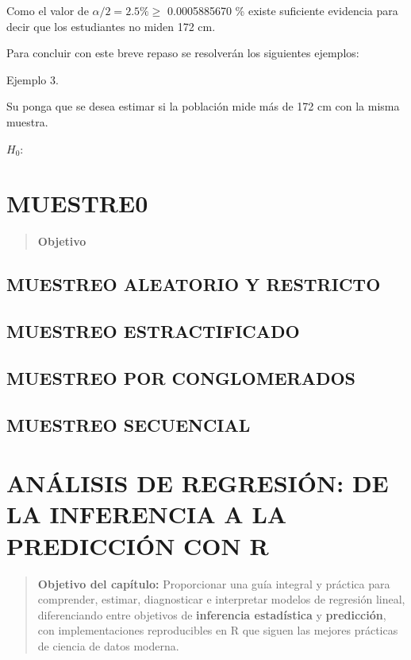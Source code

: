 \documentclass[
  oneside]{book}
\begin{document}
Como el valor de \(\alpha/2=2.5\%\geq\) 0.0005885670 \% existe suficiente evidencia para decir que los estudiantes no miden 172 cm.

Para concluir con este breve repaso se resolverán los siguientes ejemplos:

Ejemplo 3.

Su ponga que se desea estimar si la población mide más de 172 cm con la misma muestra.

\(H_0:\)

\chapter{MUESTRE0}\label{muestre0}

\begin{quote}
\textbf{Objetivo}
\end{quote}

\section{MUESTREO ALEATORIO Y RESTRICTO}\label{muestreo-aleatorio-y-restricto}

\section{MUESTREO ESTRACTIFICADO}\label{muestreo-estractificado}

\section{MUESTREO POR CONGLOMERADOS}\label{muestreo-por-conglomerados}

\section{MUESTREO SECUENCIAL}\label{muestreo-secuencial}

\chapter{ANÁLISIS DE REGRESIÓN: DE LA INFERENCIA A LA PREDICCIÓN CON R}\label{anuxe1lisis-de-regresiuxf3n-de-la-inferencia-a-la-predicciuxf3n-con-r}

\begin{quote}
\textbf{Objetivo del capítulo:} Proporcionar una guía integral y práctica para comprender, estimar, diagnosticar e interpretar modelos de regresión lineal, diferenciando entre objetivos de \textbf{inferencia estadística} y \textbf{predicción}, con implementaciones reproducibles en R que siguen las mejores prácticas de ciencia de datos moderna.
\end{quote}
\end{document}
